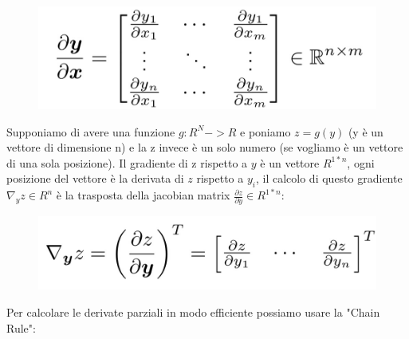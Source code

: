 \documentclass[14pt]{extreport}
\begin{document}
\begin{figure}[H]
\centering
\includegraphics[width=0.7\linewidth]{380.jpeg}
\end{figure}

Supponiamo di avere una funzione $g: R^N->R$ e poniamo $z=g(y)$ (y è un vettore di dimensione n) e la z invece è un solo numero (se vogliamo è un
vettore di una sola posizione). Il gradiente di z rispetto a $y$ è un vettore $R^{1*n}$, ogni posizione del vettore è la derivata di $z$ rispetto a
$y_i$, il calcolo di questo gradiente $\nabla_y z \in R^n$ è la trasposta della jacobian matrix $\frac{\partial z}{\partial y} \in R^{1*n}$:

\begin{figure}[H]
\centering
\includegraphics[width=0.7\linewidth]{381.jpeg}
\end{figure}

Per calcolare le derivate parziali in modo efficiente possiamo usare la "Chain Rule":
\end{document}
